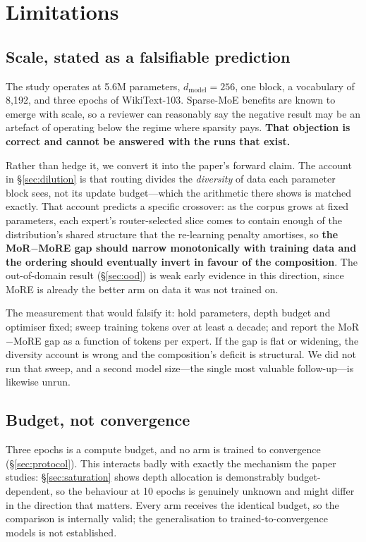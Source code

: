 \section{Limitations}
\label{sec:limitations}

\subsection{Scale, stated as a falsifiable prediction}

The study operates at 5.6M parameters, $d_{\text{model}} = 256$, one block, a
vocabulary of 8{,}192, and three epochs of WikiText-103. Sparse-MoE benefits are
known to emerge with scale, so a reviewer can reasonably say the negative result
may be an artefact of operating below the regime where sparsity pays. \textbf{That
objection is correct and cannot be answered with the runs that exist.}

Rather than hedge it, we convert it into the paper's forward claim. The account in
\S\ref{sec:dilution} is that routing divides the \emph{diversity} of data each
parameter block sees, not its update budget---which the arithmetic there shows is
matched exactly. That account predicts a specific crossover: as the corpus grows at
fixed parameters, each expert's router-selected slice comes to contain enough of
the distribution's shared structure that the re-learning penalty amortises, so
\textbf{the MoR$-$MoRE gap should narrow monotonically with training data and the
ordering should eventually invert in favour of the composition}. The out-of-domain
result (\S\ref{sec:ood}) is weak early evidence in this direction, since MoRE is
already the better arm on data it was not trained on.

The measurement that would falsify it: hold parameters, depth budget and optimiser
fixed; sweep training tokens over at least a decade; and report the MoR$-$MoRE gap
as a function of tokens per expert. If the gap is flat or widening, the diversity
account is wrong and the composition's deficit is structural. We did not run that
sweep, and a second model size---the single most valuable follow-up---is likewise
unrun.

\subsection{Budget, not convergence}

Three epochs is a compute budget, and no arm is trained to convergence
(\S\ref{sec:protocol}). This interacts badly with exactly the mechanism the paper
studies: \S\ref{sec:saturation} shows depth allocation is demonstrably
budget-dependent, so the behaviour at 10 epochs is genuinely unknown and might
differ in the direction that matters. Every arm receives the identical budget, so
the comparison is internally valid; the generalisation to trained-to-convergence
models is not established.

